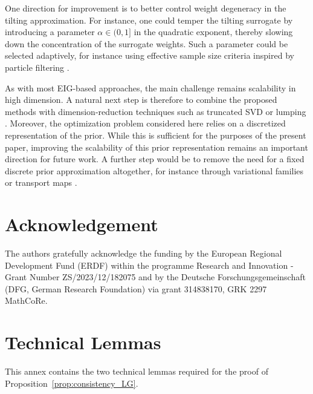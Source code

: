 \documentclass[a4paper,11pt]{article}
\begin{document}
One direction for improvement is to better control weight degeneracy in the tilting approximation. For instance, one could temper the tilting surrogate by introducing a parameter $\alpha \in (0,1]$ in the quadratic exponent, thereby slowing down the concentration of the surrogate weights. Such a parameter could be selected adaptively, for instance using effective sample size criteria inspired by particle filtering \cite{Douc2005,Li2015,lagracie2025}.


As with most EIG-based approaches, the main challenge remains scalability in high dimension. A natural next step is therefore to combine the proposed methods with dimension-reduction techniques such as truncated SVD or lumping \cite{Lopez2015,Benner2021,Plate2026}. Moreover, the optimization problem considered here relies on a discretized representation of the prior. While this is sufficient for the purposes of the present paper, improving the scalability of this prior representation remains an important direction for future work. A further step would be to remove the need for a fixed discrete prior approximation altogether, for instance through variational families \cite{Dong2025} or transport maps \cite{Koval2024}.

\section*{Acknowledgement}

The authors gratefully acknowledge the funding by the European Regional Development Fund (ERDF) within the programme Research and Innovation - Grant Number ZS/2023/12/182075 and by the Deutsche Forschungsgemeinschaft (DFG, German Research Foundation) via grant 314838170, GRK 2297 MathCoRe.

\appendix

\section{Technical Lemmas}

This annex contains the two technical lemmas required for the proof of Proposition~\ref{prop:consistency_LG}.
\end{document}
